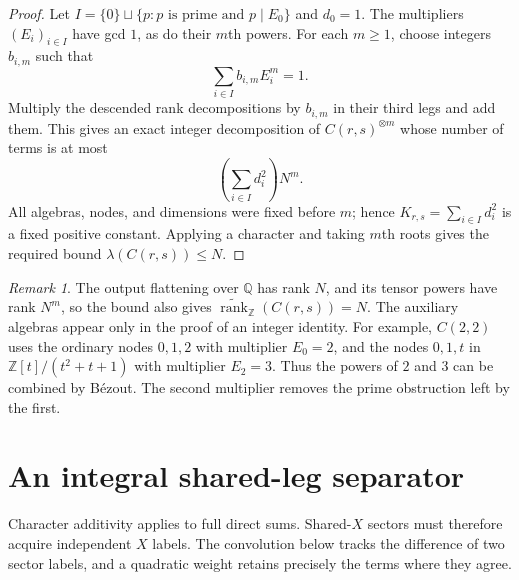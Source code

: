 \documentclass[11pt]{article}
\theoremstyle{remark}
\newtheorem{remark}[theorem]{Remark}
\newcommand{\Z}{\mathbb Z}
\newcommand{\Q}{\mathbb Q}
\newcommand{\ark}{\widetilde{\operatorname{rank}}_{\Z}}
\begin{document}
\begin{proof}
Let $I=\{0\}\sqcup\{p:p\text{ is prime and }p\mid E_0\}$ and $d_0=1$.
The multipliers $(E_i)_{i\in I}$ have gcd $1$, as do their $m$th powers.
For each $m\geq1$, choose integers $b_{i,m}$ such that
\[
 \sum_{i\in I}b_{i,m}E_i^m=1.
\]
Multiply the descended rank decompositions by $b_{i,m}$ in their
third legs and add them. This gives an exact integer decomposition
of $C(r,s)^{\otimes m}$ whose number of terms is at most
\[
 \left(\sum_{i\in I}d_i^2\right)N^m.
\]
All algebras, nodes, and dimensions were fixed before $m$; hence
$K_{r,s}=\sum_{i\in I}d_i^2$ is a fixed positive constant. Applying a
character and taking $m$th roots gives the required bound $\lambda(C(r,s))\leq N$.
\end{proof}

\begin{remark}
The output flattening over $\Q$ has rank $N$, and its tensor powers
have rank $N^m$, so the bound also gives $\ark(C(r,s))=N$.
The auxiliary algebras appear only in the proof of an integer identity.
For example, $C(2,2)$ uses the ordinary nodes $0,1,2$ with multiplier
$E_0=2$, and the nodes $0,1,t$ in $\Z[t]/(t^2+t+1)$ with multiplier
$E_2=3$. Thus the powers of $2$ and $3$ can be combined by B\'ezout.
The second multiplier removes the prime obstruction left by the first.
\end{remark}

\section{An integral shared-leg separator}

Character additivity applies to full direct sums. Shared-$X$ sectors
must therefore acquire independent $X$ labels. The convolution below
tracks the difference of two sector labels, and a quadratic weight
retains precisely the terms where they agree.
\end{document}

